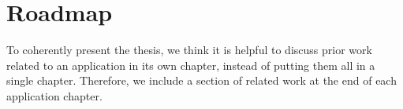 
\section{Roadmap}
To coherently present the thesis, we think it is helpful to discuss
prior work related to an application in its own chapter, instead of
putting them all in a single chapter. Therefore, we include a section
of related work at the end of each application chapter.


